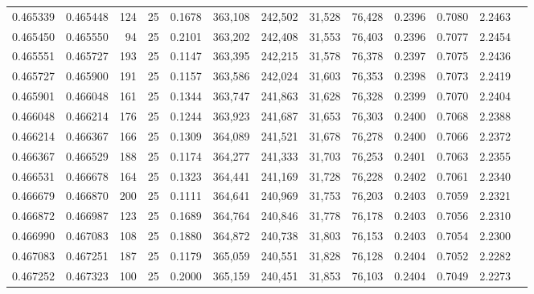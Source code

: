 \begin{tabular}{rrrrrrrrrrrrr}
0.465339 & 0.465448 &   124 &  25 &                                     0.1678 & 363,108 & 242,502 &  31,528 &  76,428 & 0.2396 & 0.7080 & 2.2463 \\
0.465450 & 0.465550 &    94 &  25 &                                     0.2101 & 363,202 & 242,408 &  31,553 &  76,403 & 0.2396 & 0.7077 & 2.2454 \\
0.465551 & 0.465727 &   193 &  25 &                                     0.1147 & 363,395 & 242,215 &  31,578 &  76,378 & 0.2397 & 0.7075 & 2.2436 \\
0.465727 & 0.465900 &   191 &  25 &                                     0.1157 & 363,586 & 242,024 &  31,603 &  76,353 & 0.2398 & 0.7073 & 2.2419 \\
0.465901 & 0.466048 &   161 &  25 &                                     0.1344 & 363,747 & 241,863 &  31,628 &  76,328 & 0.2399 & 0.7070 & 2.2404 \\
0.466048 & 0.466214 &   176 &  25 &                                     0.1244 & 363,923 & 241,687 &  31,653 &  76,303 & 0.2400 & 0.7068 & 2.2388 \\
0.466214 & 0.466367 &   166 &  25 &                                     0.1309 & 364,089 & 241,521 &  31,678 &  76,278 & 0.2400 & 0.7066 & 2.2372 \\
0.466367 & 0.466529 &   188 &  25 &                                     0.1174 & 364,277 & 241,333 &  31,703 &  76,253 & 0.2401 & 0.7063 & 2.2355 \\
0.466531 & 0.466678 &   164 &  25 &                                     0.1323 & 364,441 & 241,169 &  31,728 &  76,228 & 0.2402 & 0.7061 & 2.2340 \\
0.466679 & 0.466870 &   200 &  25 &                                     0.1111 & 364,641 & 240,969 &  31,753 &  76,203 & 0.2403 & 0.7059 & 2.2321 \\
0.466872 & 0.466987 &   123 &  25 &                                     0.1689 & 364,764 & 240,846 &  31,778 &  76,178 & 0.2403 & 0.7056 & 2.2310 \\
0.466990 & 0.467083 &   108 &  25 &                                     0.1880 & 364,872 & 240,738 &  31,803 &  76,153 & 0.2403 & 0.7054 & 2.2300 \\
0.467083 & 0.467251 &   187 &  25 &                                     0.1179 & 365,059 & 240,551 &  31,828 &  76,128 & 0.2404 & 0.7052 & 2.2282 \\
0.467252 & 0.467323 &   100 &  25 &                                     0.2000 & 365,159 & 240,451 &  31,853 &  76,103 & 0.2404 & 0.7049 & 2.2273 \\

\end{tabular}
